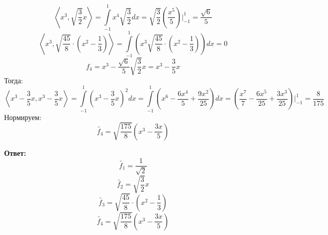 \documentclass[a4paper,12pt]{article}
\begin{document}
\[
\left\langle x^3, \sqrt{\frac{3}{2}}x \right\rangle = \int\limits_{-1}^1 x^4  \sqrt{\frac{3}{2}} dx = \sqrt{\frac{3}{2}} \left(\frac{x^5}{5}\right) \Bigg|_{-1}^1 = \frac{\sqrt{6}}{5}
\]
\[
\left\langle x^3, \sqrt{\frac{45}{8}} \cdot \left(x^2 - \frac{1}{3}\right) \right\rangle = \int\limits_{-1}^1 \left( x^3\sqrt{\frac{45}{8}} \cdot \left(x^2 - \frac{1}{3}\right) \right) dx  = 0
\]
\[
f_4 = x^3 -\frac{\sqrt{6}}{5} \sqrt{\frac{3}{2}} x= x^3 - \frac{3}{5}x
\]
Тогда:
\[
\left\langle x^3 - \frac{3}{5}x, x^3 - \frac{3}{5}x \right\rangle = \int\limits_{-1}^1 \left( x^3 - \frac{3}{5}x\right)^2 dx = \int\limits_{-1}^1 \left(x^6 - \frac{6x^4}{5} + \frac{9x^2}{25}\right) dx = \left(\frac{x^7}{7} - \frac{6x^5}{25} + \frac{3x^3}{25}\right) \Bigg|_{-1}^1 = \frac{8}{175}
\]
Нормируем:
\[
\widetilde{f_4} = \sqrt{\frac{175}{8}} \left(x^3 - \frac{3x}{5}\right)
 \]
\begin{center}
\textbf{Ответ: } 
\[
\widetilde{f_1} = \frac{1}{\sqrt{2}}
\]
\[
\widetilde{f_2} = \sqrt{\frac{3}{2}} x
\]
\[
\widetilde{f_3} =\sqrt{\frac{45}{8}} \cdot \left(x^2 - \frac{1}{3}\right)
\]
\[
\widetilde{f_4} = \sqrt{\frac{175}{8}} \left(x^3 - \frac{3x}{5}\right)
\]
\end{center}
\clearpage
\end{document}
